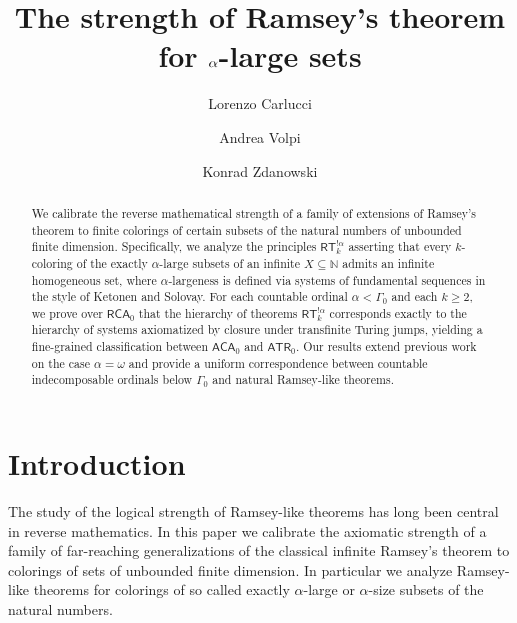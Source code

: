 \documentclass[11pt]{amsart}
\title{The strength of Ramsey's theorem for $\a$-large sets}
\author{Lorenzo Carlucci}
\author{Andrea Volpi}
\author{Konrad Zdanowski}
\theoremstyle{definition}
\theoremstyle{remark}
\theoremstyle{plain}
\def\a{\alpha}
\newcommand{\RCA}{\mathsf{RCA}_0}
\newcommand{\ACA}{\mathsf{ACA}_0}
\newcommand{\ATR}{\mathsf{ATR}_0}
\newcommand{\RT}{\mathsf{RT}}
\begin{document}
\begin{abstract}
We calibrate the reverse mathematical strength of a family of extensions of Ramsey's theorem to finite colorings of certain subsets of the natural numbers of unbounded finite dimension. 
Specifically, we analyze the principles $\RT^{!\alpha}_k$ asserting that every  $k$-coloring of the exactly $\alpha$-large subsets of an infinite $X \subseteq \mathbb{N}$ admits an infinite homogeneous set, where $\alpha$-largeness is defined via systems of fundamental sequences in the style of Ketonen and Solovay. 
For each countable ordinal $\alpha < \Gamma_0$ and each $k \geq 2$, we prove over $\RCA$ that the hierarchy of theorems $\RT^{!\a}_k$ corresponds exactly to the hierarchy of systems axiomatized by closure under transfinite Turing jumps, yielding a fine-grained classification between $\ACA$ and $\ATR$. 
Our results extend previous work on the case $\alpha=\omega$ and provide a uniform correspondence between countable indecomposable ordinals below $\Gamma_0$ and natural Ramsey-like theorems.
\end{abstract}


\maketitle


%
%
%
%

\section{Introduction}

%
%
%
%

The study of the logical strength of Ramsey-like theorems has long been central in reverse mathematics. 
In this paper we calibrate the axiomatic strength of a family of far-reaching generalizations of the classical infinite Ramsey's theorem to colorings of sets of unbounded finite dimension. 
In particular we analyze Ramsey-like theorems for colorings of so called exactly $\alpha$-large or $\a$-size subsets of the natural numbers. 
\end{document}
